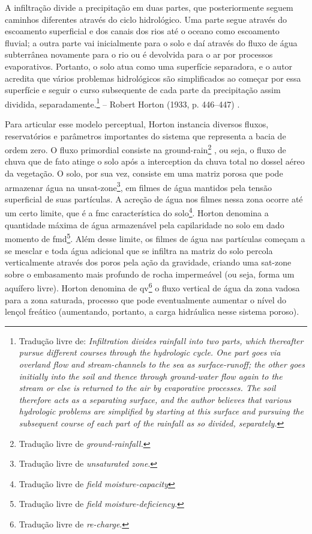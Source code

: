 \documentclass[./main.tex]{subfiles}
\begin{document}
\begin{adjustwidth}{100pt}{0pt}
\medskip
\small A infiltração divide a precipitação em duas partes, que posteriormente seguem caminhos diferentes através do ciclo hidrológico. Uma parte segue através do escoamento superficial e dos canais dos rios até o oceano como escoamento fluvial; a outra parte vai inicialmente para o solo e daí através do fluxo de água subterrânea novamente para o rio ou é devolvida para o ar por processos evaporativos. Portanto, o solo atua como uma superfície separadora, e o autor acredita que vários problemas hidrológicos são simplificados ao começar por essa superfície e seguir o curso subsequente de cada parte da precipitação assim dividida, separadamente.\footnote{Tradução livre de: \textit{Infiltration divides rainfall into two parts, which thereafter pursue different courses through the hydrologic cycle. One part goes via overland flow and stream-channels to the sea as surface-runoff; the other goes initially into the soil and thence through ground-water flow again to the stream or else is returned to the air by evaporative processes. The soil therefore acts as a separating surface, and the author believes that various hydrologic problems are simplified by starting at this surface and pursuing the subsequent course of each part of the rainfall as so divided, separately.}} -- Robert Horton (1933, p. 446–447) \cite{Horton1933}. 
\medskip
\end{adjustwidth}

\par Para articular esse modelo perceptual, Horton instancia diversos fluxos, reservatórios e parâmetros importantes do sistema que representa a bacia de ordem zero. O fluxo primordial consiste na \gls{ground-rain}\footnote{Tradução livre de \textit{ground-rainfall.}} , ou seja, o fluxo de chuva que de fato atinge o solo após a \gls{interception} da chuva total no dossel aéreo da vegetação. O solo, por sua vez, consiste em uma matriz porosa que pode armazenar água na \gls{unsat-zone}\footnote{Tradução livre de \textit{unsaturated zone}.}, em filmes de água mantidos pela tensão superficial de suas partículas. A acreção de água nos filmes nessa zona ocorre até um certo limite, que é a \gls{fmc} característica do solo\footnote{Tradução livre de \textit{field moisture-capacity}}. Horton denomina a quantidade máxima de água armazenável pela capilaridade no solo em dado momento de \gls{fmd}\footnote{Tradução livre de \textit{field moisture-deficiency}.}. Além desse limite, os filmes de água nas partículas começam a se mesclar e toda água adicional que se infiltra na matriz do solo percola verticalmente através dos poros pela ação da gravidade, criando uma \gls{sat-zone} sobre o embasamento mais profundo de rocha impermeável (ou seja, forma um aquífero livre). Horton denomina de \gls{qv}\footnote{Tradução livre de \textit{re-charge}.} o fluxo vertical de água da zona vadosa para a zona saturada, processo que pode eventualmente aumentar o nível do lençol freático (aumentando, portanto, a carga hidráulica nesse sistema poroso).
\end{document}
